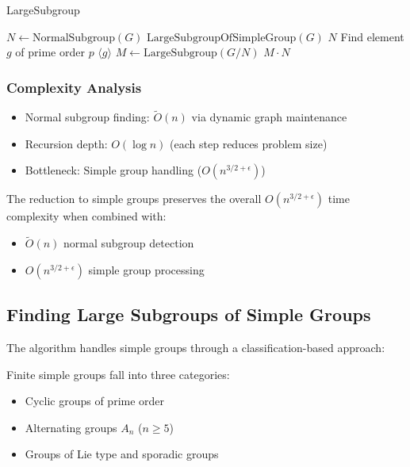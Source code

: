 \documentclass[sigconf]{acmart}
\begin{document}
\begin{algorithm}[H]
\caption{LargeSubgroup}
\begin{algorithmic}[1]
\STATE \( N \gets \text{NormalSubgroup}(G) \)
    \RETURN \(\text{LargeSubgroupOfSimpleGroup}(G)\)
    \RETURN \( N \)
    \STATE Find element \( g \) of prime order \( p \)
    \RETURN \( \langle g \rangle \)
\ELSE
    \STATE \( M \gets \text{LargeSubgroup}(G/N) \)
    \RETURN \( M \cdot N \)
\ENDIF
\end{algorithmic}
\end{algorithm}

\subsubsection{Complexity Analysis}
\begin{itemize}
    \item Normal subgroup finding: \( \widetilde{O}(n) \) via dynamic graph maintenance
    \item Recursion depth: \( O(\log n) \) (each step reduces problem size)
    \item Bottleneck: Simple group handling (\( O(n^{3/2+\epsilon}) \))
\end{itemize}

\begin{theorem}
The reduction to simple groups preserves the overall \( O(n^{3/2+\epsilon}) \) time complexity when combined with:
\begin{itemize}
    \item \( \widetilde{O}(n) \) normal subgroup detection
    \item \( O(n^{3/2+\epsilon}) \) simple group processing
\end{itemize}
\end{theorem}

\subsection{Finding Large Subgroups of Simple Groups}
\label{sec:simple-subgroups}

The algorithm handles simple groups through a classification-based approach:

\begin{definition}
Finite simple groups fall into three categories:
\begin{itemize}
    \item Cyclic groups of prime order
    \item Alternating groups $A_n$ ($n \geq 5$)
    \item Groups of Lie type and sporadic groups
\end{itemize}
\end{definition}
\end{document}
